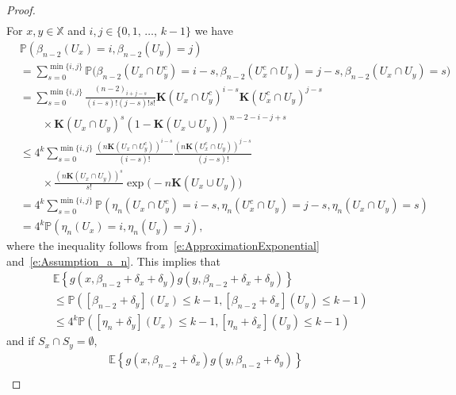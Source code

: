 \documentclass[10pt]{amsart}
\theoremstyle{definition}\newtheorem{defi}[theo]{Definition}\newtheorem{rema}[theo]{Remark}\newtheorem{exam}[theo]{Example}\newtheorem{exem}[theo]{Example}\newtheorem{nota}[theo]{Notation}
\newcommand*\bK{\mathbf{K}}
\renewcommand*\P{\mathbb{P}}
\newcommand*\X{\mathbb{X}}
\newcommand{\E}{\mathbb{E}}
\newcommand{\mean}[1] {\E\left\{{#1}\right\}}
\newcommand{\prob}[1]{\P\left(#1\right)}
\begin{document}
\begin{proof}
\begin{equation}
\begin{split}
\end{split}
\end{equation}
For $x,y\in\X$ and $i,j\in\{0,1,\,\hdots,\,k-1\}$ we have
\begin{align*}
& \prob{\beta_{n-2}\left(U_{x}\right)=i, \beta_{n-2}\left(U_{y}\right)=j} \\
& = \sum_{s=0}^{\min\{i,j\}} \P\big(\beta_{n-2}\left(U_{x}\cap U_{y}^c\right)=i-s, \beta_{n-2}\left(U_{x}^c\cap U_{y}\right)=j-s, \beta_{n-2}\left(U_{x}\cap U_{y}\right)=s \big) \\
& = \sum_{s=0}^{\min\{i,j\}} \frac{(n-2)_{i+j-s}}{(i-s)! (j-s)! s!} \bK\left(U_{x}\cap U_{y}^c\right)^{i-s} \bK\left(U_{x}^c\cap U_{y}\right)^{j-s} \\
&\qquad\times\bK\left(U_{x}\cap U_{y}\right)^{s} \left(1- \bK\left(U_{x}\cup U_{y}\right) \right)^{n-2-i-j+s} \\
& \leq 4^k \sum_{s=0}^{\min\{i,j\}} \frac{\left(n\bK\left(U_{x}\cap U_{y}^c\right)\right)^{i-s}}{(i-s)!} \frac{\left(n\bK\left(U_{x}^c\cap U_{y}\right)\right)^{j-s}}{(j-s)!}\\
&\qquad\times\frac{\left(n\bK\left(U_{x}\cap U_{y}\right)\right)^{s}}{s!} \exp\big(-n\bK\left(U_{x}\cup U_{y}\right) \big) \\
& = 4^k \sum_{s=0}^{\min\{i,j\}} \P\left(\eta_{n}\left(U_{x}\cap U_{y}^c\right)=i-s, \eta_{n}\left(U_{x}^c\cap U_{y}\right)=j-s, \eta_{n}\left(U_{x}\cap U_{y}\right)=s \right) \\
& = 4^k \prob{\eta_{n}\left(U_{x}\right)=i, \eta_{n}\left(U_{y}\right)=j},
\end{align*}
where the inequality follows from~\eqref{e:ApproximationExponential} and~\eqref{e:Assumption_a_n}. This implies that
\begin{equation}\label{e:Productgs}
\begin{split}
& \mean{g\left(x,\beta_{n-2}+\delta_x+\delta_y\right) g\left(y,\beta_{n-2}+\delta_x+\delta_y\right)} \\
& \leq \prob{\left[\beta_{n-2}+\delta_y\right]\left(U_{x}\right)\leq k-1, \left[\beta_{n-2}+\delta_x\right]\left(U_{y}\right)\leq k-1} \\
& \leq 4^k \prob{\left[\eta_{n}+\delta_y\right]\left(U_{x}\right)\leq k-1, \left[\eta_{n}+\delta_x\right]\left(U_{y}\right)\leq k-1}
\end{split}
\end{equation}
and if $S_{x}\cap S_{y}=\emptyset$,
\begin{multline}\label{e:gSquareDisjoint}
\mean{g\left(x,\beta_{n-2}+\delta_x\right) g\left(y,\beta_{n-2}+\delta_y\right)}\\

\end{multline}
\end{proof}
\end{document}
